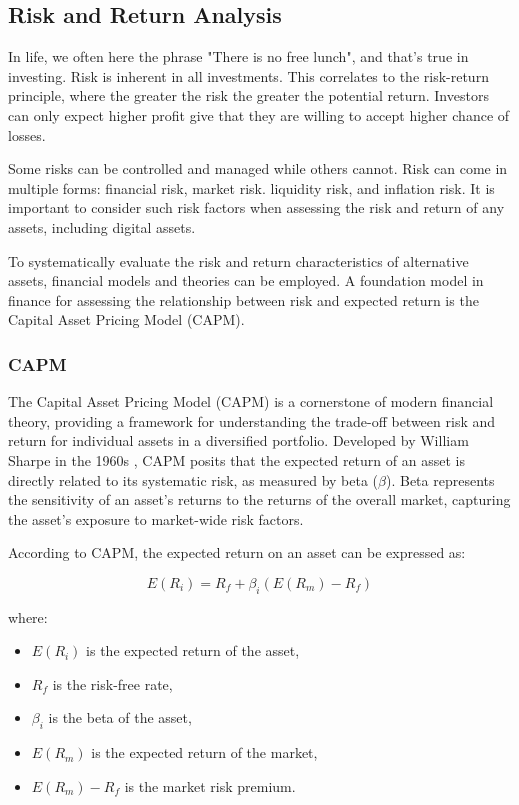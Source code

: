 \subsection{Risk and Return Analysis}

In life, we often here the phrase "There is no free lunch", and that's true in investing. Risk is inherent in all investments. This correlates to the risk-return principle, where the greater the risk the greater the potential return. Investors can only expect higher profit give that they are willing to accept higher chance of losses.

Some risks can be controlled and managed while others cannot. Risk can come in multiple forms: financial risk, market risk. liquidity risk, and inflation risk.  It is important to consider such risk factors when assessing the risk and return of any assets, including digital assets. 

To systematically evaluate the risk and return characteristics of alternative assets, financial models and theories can be employed. A foundation model in finance for assessing the relationship between risk and expected return is the Capital Asset Pricing Model (CAPM).

\subsubsection{CAPM}
The Capital Asset Pricing Model (CAPM) is a cornerstone of modern financial theory, providing a framework for understanding the trade-off between risk and return for individual assets in a diversified portfolio. Developed by William Sharpe in the 1960s \cite{Sharpe1964}, CAPM posits that the expected return of an asset is directly related to its systematic risk, as measured by beta (\(\beta\)). Beta represents the sensitivity of an asset's returns to the returns of the overall market, capturing the asset's exposure to market-wide risk factors.

According to CAPM, the expected return on an asset can be expressed as:

\begin{equation}\label{eq:CAPM}
E(R_i) = R_f + \beta_i (E(R_m) - R_f)
\end{equation}


where:

\begin{itemize}
    \item $E(R_i)$ is the expected return of the asset,
    \item $R_f$ is the risk-free rate,
    \item $\beta_i$ is the beta of the asset,
    \item $E(R_m)$ is the expected return of the market,
    \item $E(R_m) - R_f$ is the market risk premium.
\end{itemize}

